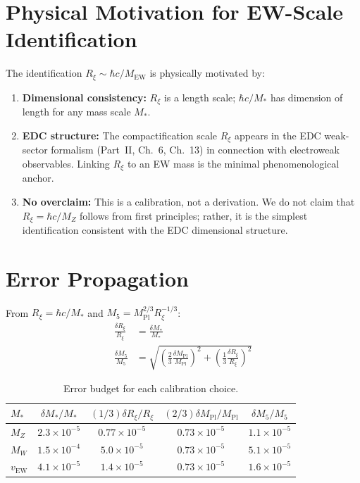 \documentclass[11pt,a4paper]{article}
\newcommand{\Rxi}{R_\xi}
\newcommand{\Mpl}{M_{\mathrm{Pl}}}
\newcommand{\Mfive}{M_5}
\newcommand{\MZ}{M_Z}
\newcommand{\MW}{M_W}
\newcommand{\vEW}{v_{\mathrm{EW}}}
\begin{document}
\section{Physical Motivation for EW-Scale Identification}

The identification $\Rxi \sim \hbar c / M_{\mathrm{EW}}$ is physically motivated by:
\begin{enumerate}
\item \textbf{Dimensional consistency:} $\Rxi$ is a length scale; $\hbar c / M_*$ has
      dimension of length for any mass scale $M_*$.
\item \textbf{EDC structure:} The compactification scale $\Rxi$ appears in the EDC
      weak-sector formalism (Part~II, Ch.~6, Ch.~13) in connection with electroweak
      observables. Linking $\Rxi$ to an EW mass is the minimal phenomenological anchor.
\item \textbf{No overclaim:} This is a calibration, not a derivation. We do not claim
      that $\Rxi = \hbar c / \MZ$ follows from first principles; rather, it is the
      simplest identification consistent with the EDC dimensional structure.
\end{enumerate}

\section{Error Propagation}

From $\Rxi = \hbar c / M_*$ and $\Mfive = \Mpl^{2/3} \Rxi^{-1/3}$:
\begin{align}
\frac{\delta \Rxi}{\Rxi} &= \frac{\delta M_*}{M_*} \label{eq:dRxi} \\
\frac{\delta \Mfive}{\Mfive} &= \sqrt{\left(\frac{2}{3} \frac{\delta \Mpl}{\Mpl}\right)^2
+ \left(\frac{1}{3} \frac{\delta \Rxi}{\Rxi}\right)^2} \label{eq:dM5}
\end{align}

\begin{table}[h]
\centering
\caption{Error budget for each calibration choice.}
\label{tab:error-budget}
\begin{tabular}{@{}lcccc@{}}
\toprule
$M_*$ & $\delta M_* / M_*$ & $(1/3)\delta\Rxi/\Rxi$ & $(2/3)\delta\Mpl/\Mpl$ & $\delta\Mfive/\Mfive$ \\
\midrule
$\MZ$ & $2.3 \times 10^{-5}$ & $0.77 \times 10^{-5}$ & $0.73 \times 10^{-5}$ & $1.1 \times 10^{-5}$ \\
$\MW$ & $1.5 \times 10^{-4}$ & $5.0 \times 10^{-5}$ & $0.73 \times 10^{-5}$ & $5.1 \times 10^{-5}$ \\
$\vEW$ & $4.1 \times 10^{-5}$ & $1.4 \times 10^{-5}$ & $0.73 \times 10^{-5}$ & $1.6 \times 10^{-5}$ \\
\bottomrule
\end{tabular}
\end{table}
\end{document}
